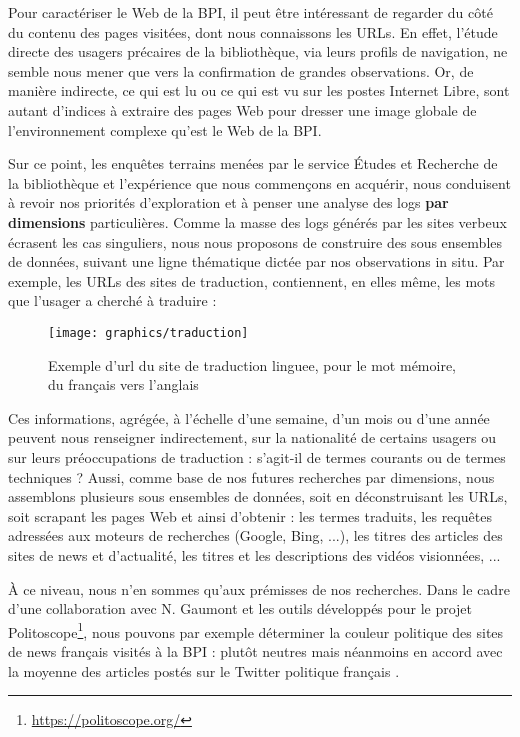 \documentclass[symmetric,justified,marginals=raggedouter]{tufte-book}
\begin{document}
\noindent Pour caractériser le Web de la BPI, il peut être intéressant de regarder du côté du contenu des pages visitées, dont nous connaissons les URLs. En effet, l'étude directe des usagers précaires de la bibliothèque, via leurs profils de navigation, ne semble nous mener que vers la confirmation de grandes observations. Or, de manière indirecte, ce qui est lu ou ce qui est vu sur les postes Internet Libre, sont autant d'indices à extraire des pages Web pour dresser une image globale de l'environnement complexe qu'est le Web de la BPI.

Sur ce point, les enquêtes terrains menées par le service Études et Recherche de la bibliothèque et l'expérience que nous commençons en acquérir, nous conduisent à revoir nos priorités d'exploration et à penser une analyse des logs \textbf{par dimensions} particulières. Comme la masse des logs générés par les sites verbeux écrasent les cas singuliers, nous nous proposons de construire des sous ensembles de données, suivant une ligne thématique dictée par nos observations in situ. Par exemple, les URLs des sites de traduction, contiennent, en elles même, les mots que l'usager a cherché à traduire :

\begin{figure}
  \texttt{[image: graphics/traduction]}
  \caption{Exemple d'url du site de traduction linguee, pour le mot mémoire, du français vers l'anglais}
  \label{fig:traduction}
\end{figure} 

\noindent Ces informations, agrégée, à l'échelle d'une semaine, d'un mois ou d'une année peuvent nous renseigner indirectement, sur la nationalité de certains usagers ou sur leurs préoccupations de traduction : s'agit-il de termes courants ou de termes techniques ? Aussi, comme base de nos futures recherches par dimensions, nous assemblons plusieurs sous ensembles de données, soit en déconstruisant les URLs, soit scrapant les pages Web et ainsi d'obtenir : les termes traduits, les requêtes adressées aux moteurs de recherches (Google, Bing, ...), les titres des articles des sites de news et d'actualité, les titres et les descriptions des vidéos visionnées, ...

À ce niveau, nous n'en sommes qu'aux prémisses de nos recherches. Dans le cadre d'une collaboration avec N. Gaumont et les outils développés pour le projet Politoscope\footnote{\url{https://politoscope.org/}}, nous pouvons par exemple déterminer la couleur politique des sites de news français visités à la BPI : plutôt neutres mais néanmoins en accord avec la moyenne des articles postés sur le Twitter politique français \citep{gaumont_methods_2017}. 
\end{document}
